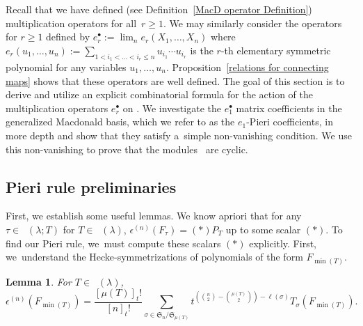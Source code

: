 \documentclass[10pt,a4paper]{amsart}
\numberwithin{equation}{section}
\newtheorem{Lemma}[Theorem]{Lemma}
\theoremstyle{definition}
\DeclareMathOperator{\RYT}{\mathrm{RYT}_{\geq 0}}
\DeclareMathOperator{\PSYT}{\mathrm{PSYT}_{\geq 0}}
\DeclareMathOperator{\RSSYT}{\mathrm{RSSYT}_{\geq 0}}
\DeclareMathOperator{\Min}{\mathrm{min}}
\begin{document}
Recall that we have defined (see Definition~\ref{MacD operator Definition}) multiplication operators  for all~${r\geq 1}$. We may similarly consider the operators  for $r\geq 1$ defined by $e_r^{\bullet} := \lim_{n} e_r(X_1,\dots,X_n) $ where $e_r(u_1,\dots,u_n):=\sum_{1<i_1<\dots< i_r \leq n} u_{i_1}\cdots u_{i_r}$ is the $r$-th elementary symmetric polynomial for any variables $u_1,\dots,u_n$.
 Proposition~\ref{relations for connecting maps} shows that these operators are well defined. The goal of this section is to derive and utilize an explicit combinatorial formula for the action of the multiplication operators $e_r^{\bullet}$ on . We investigate the $e_1^{\bullet}$ matrix coefficients in the generalized Macdonald basis, which we refer to as the $e_1$-Pieri coefficients, in more depth and show that they satisfy a~simple non-vanishing condition. We use this non-vanishing to prove that the modules~ are cyclic.

\subsection{Pieri rule preliminaries}

First, we establish some useful lemmas.
 We know apriori that for any $\tau \in \PSYT(\lambda;\allowbreak T)$ for $T \in \RSSYT(\lambda)$, $\epsilon^{(n)}(F_{\tau})= (*)P_{T}$ up to some scalar $(*)$. To find our Pieri rule, we~must compute these scalars $(*)$ explicitly. First, we~understand the Hecke-symmetrizations of polynomials of the form $F_{\Min(T)}$.

\begin{Lemma}\label{sym of min term}
 For $T \in \RYT(\lambda)$,
 \[
 \epsilon^{(n)}(F_{\Min(T)}) = \frac{[\mu(T)]_{t}!}{[n]_{t}!} \sum_{\sigma \in \mathfrak{S}_n/\mathfrak{S}_{\mu(T)}} t^{ ({n \choose 2} - {\mu(T) \choose 2}) - \ell(\sigma)}T_{\sigma}(F_{\Min(T)}).
 \]

\end{Lemma}
\end{document}
